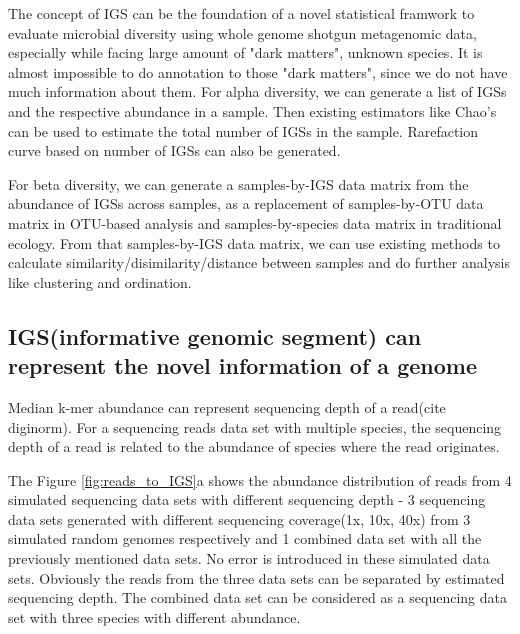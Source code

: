 The concept of IGS can be the foundation of a novel statistical framwork to
evaluate microbial diversity using whole genome shotgun metagenomic data, 
especially while facing large amount of "dark matters", unknown species. It is
almost impossible to do annotation to those "dark matters", since we do not
have much information about them. 
For alpha diversity, we can generate a list of IGSs and the respective 
abundance in a sample. Then existing estimators like Chao's can be used to 
estimate the total number of IGSs in the sample. Rarefaction curve based on 
number of IGSs can also be generated. 

For beta diversity, we can generate a samples-by-IGS data matrix from the
abundance of IGSs across samples, as a replacement of samples-by-OTU data 
matrix in OTU-based analysis and samples-by-species data matrix in traditional 
ecology. From that samples-by-IGS data matrix, we can use existing methods to 
calculate similarity/disimilarity/distance between samples and do further 
analysis like clustering and ordination. 





\subsection{IGS(informative genomic segment) can represent the novel 
information of a genome}

Median k-mer abundance can represent sequencing depth of a read(cite diginorm).
 For a sequencing reads data set with multiple species, the sequencing depth of
 a read is related to the abundance of species where the read originates. 

The Figure \ref{fig:reads_to_IGS}a  shows the abundance distribution of reads 
from 4 simulated sequencing data sets with different sequencing depth - 3 
sequencing data sets generated with different sequencing coverage(1x, 10x, 40x)
 from 3 simulated random genomes respectively and 1 combined data set with all 
the previously mentioned data sets. No error is introduced in these simulated 
data sets. Obviously the reads from the three data sets can be separated by 
estimated sequencing depth. The combined data set can be considered as a 
sequencing data set with three species with different abundance.

